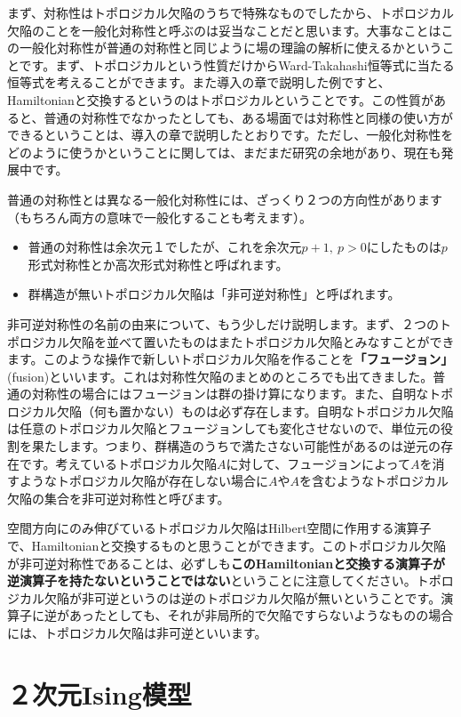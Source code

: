 \documentclass[report,paper=a4, fontsize=12pt, line_length=16cm, number_of_lines=33,dvipdfmx]{jlreq}
\newcommand{\kyou}[1]{{\sffamily \bfseries #1}}
\numberwithin{equation}{chapter}
\begin{document}
まず、対称性はトポロジカル欠陥のうちで特殊なものでしたから、トポロジカル欠陥のことを一般化対称性と呼ぶのは妥当なことだと思います。大事なことはこの一般化対称性が普通の対称性と同じように場の理論の解析に使えるかということです。まず、トポロジカルという性質だけからWard-Takahashi恒等式に当たる恒等式を考えることができます。また導入の章で説明した例ですと、Hamiltonianと交換するというのはトポロジカルということです。この性質があると、普通の対称性でなかったとしても、ある場面では対称性と同様の使い方ができるということは、導入の章で説明したとおりです。ただし、一般化対称性をどのように使うかということに関しては、まだまだ研究の余地があり、現在も発展中です。

普通の対称性とは異なる一般化対称性には、ざっくり２つの方向性があります（もちろん両方の意味で一般化することも考えます）。
\begin{itemize}
  \item 普通の対称性は余次元１でしたが、これを余次元$p+1,\ p>0$にしたものは$p$形式対称性とか高次形式対称性と呼ばれます。
  \item 群構造が無いトポロジカル欠陥は「非可逆対称性」と呼ばれます。
\end{itemize}

非可逆対称性の名前の由来について、もう少しだけ説明します。まず、２つのトポロジカル欠陥を並べて置いたものはまたトポロジカル欠陥とみなすことができます。このような操作で新しいトポロジカル欠陥を作ることを\kyou{「フュージョン」}(fusion)といいます。これは対称性欠陥のまとめのところでも出てきました。普通の対称性の場合にはフュージョンは群の掛け算になります。また、自明なトポロジカル欠陥（何も置かない）ものは必ず存在します。自明なトポロジカル欠陥は任意のトポロジカル欠陥とフュージョンしても変化させないので、単位元の役割を果たします。つまり、群構造のうちで満たさない可能性があるのは逆元の存在です。考えているトポロジカル欠陥$A$に対して、フュージョンによって$A$を消すようなトポロジカル欠陥が存在しない場合に$A$や$A$を含むようなトポロジカル欠陥の集合を非可逆対称性と呼びます。

空間方向にのみ伸びているトポロジカル欠陥はHilbert空間に作用する演算子で、Hamiltonianと交換するものと思うことができます。このトポロジカル欠陥が非可逆対称性であることは、必ずしも\kyou{このHamiltonianと交換する演算子が逆演算子を持たないということではない}ということに注意してください。トポロジカル欠陥が非可逆というのは逆のトポロジカル欠陥が無いということです。演算子に逆があったとしても、それが非局所的で欠陥ですらないようなものの場合には、トポロジカル欠陥は非可逆といいます。

\chapter{２次元Ising模型}
\end{document}
